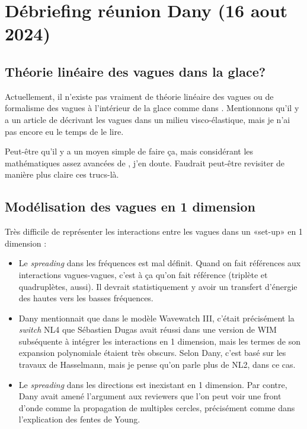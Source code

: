 \documentclass[10pt]{article}
\numberwithin{equation}{section}
\begin{document}
\section{Débriefing réunion Dany (16 aout 2024)}
\label{sec:org5140feb}

\subsection{Théorie linéaire des vagues dans la glace?}
\label{sec:org8e7544a}
Actuellement, il n'existe pas vraiment de théorie linéaire des vagues ou de formalisme des vagues à l'intérieur de la glace comme dans \Textcite{miles1957generation}.
Mentionnons qu'il y a un article de \Textcite{miles1996surface} décrivant les vagues dans un milieu visco-élastique, mais je n'ai pas encore eu le temps de le lire.\bigskip

Peut-être qu'il y a un moyen simple de faire ça, mais considérant les mathématiques assez avancées de \Textcite{miles1957generation}, j'en doute.
Faudrait peut-être revisiter de manière plus claire ces trucs-là.
\subsection{Modélisation des vagues en 1 dimension}
\label{sec:org0a0dfe4}
Très difficile de représenter les interactions  entre les vagues dans un «set-up» en 1 dimension : 
\begin{itemize}
\item Le \emph{spreading} dans les fréquences est mal définit.
Quand on fait références aux interactions vagues-vagues, c'est à ça qu'on fait référence (triplète et quadruplètes, aussi).
Il devrait statistiquement y avoir un transfert d'énergie des hautes vers les basses fréquences.
\item Dany mentionnait que dans le modèle Wavewatch III, c'était précisément la \emph{switch} NL4 que Sébastien Dugas avait réussi dans une version de WIM subséquente à intégrer les interactions en 1 dimension, mais les termes de son expansion polynomiale étaient très obscurs.
Selon Dany, c'est basé sur les travaux de Hasselmann, mais je pense qu'on parle plus de NL2, dans ce cas.
\item Le \emph{spreading} dans les directions est inexistant en 1 dimension.
Par contre, Dany avait amené l'argument aux reviewers que l'on peut voir une front d'onde comme la propagation de multiples cercles, précisément comme dans l'explication des fentes de Young.
\end{itemize}
\end{document}

